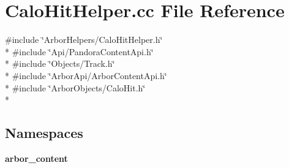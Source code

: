 \section{Calo\+Hit\+Helper.\+cc File Reference}
\label{CaloHitHelper_8cc}
{\ttfamily \#include \char`\"{}Arbor\+Helpers/\+Calo\+Hit\+Helper.\+h\char`\"{}}\\*
{\ttfamily \#include \char`\"{}Api/\+Pandora\+Content\+Api.\+h\char`\"{}}\\*
{\ttfamily \#include \char`\"{}Objects/\+Track.\+h\char`\"{}}\\*
{\ttfamily \#include \char`\"{}Arbor\+Api/\+Arbor\+Content\+Api.\+h\char`\"{}}\\*
{\ttfamily \#include \char`\"{}Arbor\+Objects/\+Calo\+Hit.\+h\char`\"{}}\\*
\subsection*{Namespaces}
\begin{DoxyCompactItemize}
\item 
 {\bf arbor\+\_\+content}
\end{DoxyCompactItemize}
